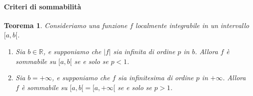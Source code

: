 \documentclass{article}
\theoremstyle{plain}
\newtheorem{thm}{Teorema}[section]
\theoremstyle{definition}
\theoremstyle{remark}
\begin{document}
\paragraph{Criteri di sommabilità}
\begin{bxthm}
\begin{thm}
    Consideriamo una funzione $f$ localmente integrabile in un intervallo $[a,b[$.
    \begin{enumerate}
        \item Sia $b\in\mathbb{R}$, e supponiamo che $|f|$ sia infinita di ordine $p$ in $b$. Allora $f$ è sommabile su $[a,b[$ se e solo se $p<1$.
        \item Sia $b=+\infty$, e supponiamo che $f$ sia infinitesima di ordine $p$ in $+\infty$. Allora $f$ è sommabile su $[a,b[=[a,+\infty[$ se e solo se $p>1$.
    \end{enumerate}
\end{thm}
\end{bxthm}
\end{document}
